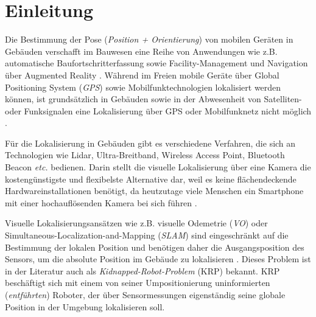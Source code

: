 
\section{Einleitung}
%
%
%
%
%
%
%
%
%
%
%
%
%
%




Die Bestimmung der Pose (\textit{Position + Orientierung}) von mobilen Geräten in Gebäuden verschafft im Bauwesen eine Reihe von Anwendungen wie z.B. automatische Baufortschritterfassung sowie Facility-Management und Navigation über Augmented Reality \cite{kroppModelbasedPoseEstimation2016, kochNaturalMarkersAugmented2014}.
Während im Freien mobile Geräte über Global Positioning System (\textit{GPS}) sowie Mobilfunktechnologien lokalisiert werden können, ist grundsätzlich in Gebäuden sowie in der Abwesenheit von Satelliten- oder Funksignalen eine Lokalisierung über GPS oder Mobilfunknetz nicht möglich \cite{yassinRecentAdvancesIndoor2016}. 

Für die Lokalisierung in Gebäuden gibt es verschiedene Verfahren, die sich an Technologien wie Lidar, Ultra-Breitband, Wireless Access Point, Bluetooth Beacon \textit{etc.} bedienen. Darin stellt die visuelle Lokalisierung über eine Kamera die kostengünstigste und flexibelste Alternative dar, weil es keine flächendeckende Hardwareinstallationen benötigt, da heutzutage viele Menschen ein Smartphone mit einer hochauflösenden Kamera bei sich führen \cite{wuImageBasedCamera2016}.

Visuelle Lokalisierungsansätzen wie z.B. 
visuelle Odemetrie (\textit{VO}) oder Simultaneous-Localization-and-Mapping (\textit{SLAM}) sind eingeschränkt auf die Bestimmung der lokalen Position und benötigen daher die Ausgangsposition des Sensors, um die absolute Position im Gebäude zu lokalisieren \cite{stephenseGlobalLocalizationUsing2002}. Dieses Problem ist in der Literatur auch als \textit{Kidnapped-Robot-Problem} (KRP) bekannt. KRP beschäftigt sich mit einem von seiner Umpositionierung uninformierten (\textit{entführten}) Roboter, der über Sensormessungen eigenständig seine globale Position in der Umgebung lokalisieren soll.


